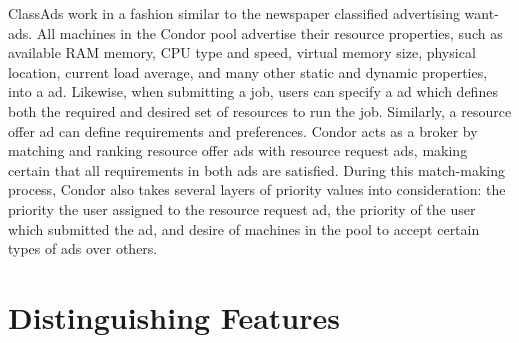 ClassAds work in a fashion similar to the newspaper classified
advertising want-ads. All machines in the Condor pool advertise their
resource properties, such as available RAM memory, CPU type and speed,
virtual memory size, physical location, current load average, and many
other static and dynamic properties, into a  ad.
Likewise,
when submitting a job, users can specify a  ad
which
defines both the required and desired set of resources to run the job.
Similarly, a resource offer ad can define requirements and preferences.
Condor acts as a broker by matching and ranking resource
offer ads with resource request ads, making certain that all
requirements in both ads are satisfied. During this match-making
process, Condor also takes several layers of priority values into
consideration: the priority the user assigned to the resource request
ad, the priority of the user which submitted the ad, and desire of
machines in the pool to accept certain types of ads over others. 

\section{Distinguishing Features}

